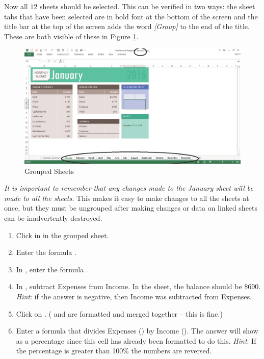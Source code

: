 Now all $ 12 $ sheets should be selected. This can be verified in two ways: the sheet tabs that have been selected are in bold font at the bottom of the screen and the title bar at the top of the screen adds the word \textit{[Group]} to the end of the title. These are both visible of these in Figure \ref{06:fig04}.

\begin{figure}[H]
	\centering
	\includegraphics[width=\maxwidth{.95\linewidth}]{gfx/ch06_fig04}
	\caption{Grouped Sheets}
	\label{06:fig04}
\end{figure}

\textit{It is important to remember that any changes made to the January sheet will be made to all the sheets.} This makes it easy to make changes to all the sheets at once, but they must be ungrouped after making changes or data on linked sheets can be inadvertently destroyed. 

\begin{enumerate}
	\item Click in  in the  grouped sheet.
	\item Enter the formula .
	\item In , enter the formula .
	\item In , subtract Expenses from Income. In the  sheet, the balance should be \$690. \textit{Hint}: if the answer is negative, then Income was subtracted from Expenses.
	\item Click on . ( and  are formatted and merged together – this is fine.)
	\item Enter a formula that divides Expenses () by Income (). The answer will show as a percentage since this cell has already been formatted to do this. \textit{Hint}: If the percentage is greater than 100\% the numbers are reversed.
\end{enumerate}


